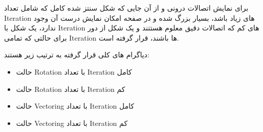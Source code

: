 \documentclass[12pt,titlepage,a4page , tikz , multi,table , svgnames,xcdraw]{article}
\begin{document}
برای نمایش اتصالات درونی و از آن جایی که شکل سنتز شده کامل که شامل تعداد Iteration های زیاد باشد، بسیار بزرگ شده و در صفحه امکان نمایش درست آن وجود ندارد، یک شکل با Iteration های کم که اتصالات دقیق معلوم هستتند و یک شکل از دور برای حالتی که تمامی Iteration ها باشند، قرار گرفته است.

دیاگرام های کلی قرار گرفته به ترتیب زیر هستند:


\begin{itemize}

\item
حالت Rotation با تعداد Iteration کامل

\item
حالت Rotation با تعداد Iteration کم

\item
حالت Vectoring با تعداد Iteration کامل

\item
حالت Vectoring با تعداد Iteration کم


\end{itemize}

\newpage

\begin{landscape}

\thispagestyle{empty}




\end{landscape}


\newpage

\begin{landscape}

\thispagestyle{empty}


\end{landscape}
\newpage



\begin{landscape}
\thispagestyle{empty}


\end{landscape}

\begin{landscape}
\thispagestyle{empty}


\end{landscape}

\begin{landscape}
\thispagestyle{empty}


\end{landscape}
\end{document}
